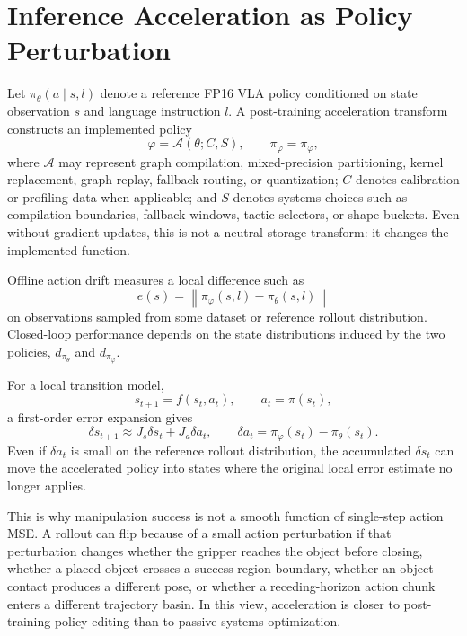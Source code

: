 \documentclass[10pt]{article}
\newcommand{\dpi}{d_{\pi_\theta}}
\newcommand{\da}{d_{\pi_\varphi}}
\begin{document}
\section{Inference Acceleration as Policy Perturbation}

Let $\pi_\theta(a \mid s,l)$ denote a reference FP16 VLA policy conditioned on state observation $s$ and language instruction $l$. A post-training acceleration transform constructs an implemented policy
\begin{equation}
    \varphi = \mathcal{A}(\theta; C, S), \qquad \pi_\varphi = \pi_{\varphi},
\end{equation}
where $\mathcal{A}$ may represent graph compilation, mixed-precision partitioning, kernel replacement, graph replay, fallback routing, or quantization; $C$ denotes calibration or profiling data when applicable; and $S$ denotes systems choices such as compilation boundaries, fallback windows, tactic selectors, or shape buckets. Even without gradient updates, this is not a neutral storage transform: it changes the implemented function.

Offline action drift measures a local difference such as
\begin{equation}
    e(s) = \left\| \pi_\varphi(s,l) - \pi_\theta(s,l) \right\|
\end{equation}
on observations sampled from some dataset or reference rollout distribution. Closed-loop performance depends on the state distributions induced by the two policies, $\dpi$ and $\da$.

For a local transition model,
\begin{equation}
    s_{t+1}=f(s_t,a_t), \qquad a_t=\pi(s_t),
\end{equation}
a first-order error expansion gives
\begin{equation}
    \delta s_{t+1} \approx J_s \delta s_t + J_a \delta a_t,
    \qquad
    \delta a_t = \pi_\varphi(s_t)-\pi_\theta(s_t).
\end{equation}
Even if $\delta a_t$ is small on the reference rollout distribution, the accumulated $\delta s_t$ can move the accelerated policy into states where the original local error estimate no longer applies.

This is why manipulation success is not a smooth function of single-step action MSE. A rollout can flip because of a small action perturbation if that perturbation changes whether the gripper reaches the object before closing, whether a placed object crosses a success-region boundary, whether an object contact produces a different pose, or whether a receding-horizon action chunk enters a different trajectory basin. In this view, acceleration is closer to post-training policy editing than to passive systems optimization.
\end{document}
